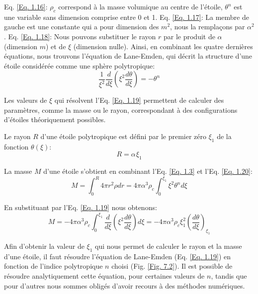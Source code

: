 Eq. \ref{Eq. 1.16}: $\rho_{c}$ correspond à la masse volumique au centre de l'étoile, $\theta^{n}$ est une variable sans dimension
comprise entre 0 et 1.\smallskip\newline
Eq. \ref{Eq. 1.17}: La membre de gauche est une constante qui a pour dimension des $m^{2}$, nous la remplaçons par $\alpha^{2}$.\smallskip\newline
Eq. \ref{Eq. 1.18}: Nous pouvons substituer le rayon $r$ par le produit de $\alpha$ (dimension $m$) et de $\xi$ (dimension nulle).\bigskip
Ainsi, en combinant les quatre dernières équations, nous trouvons l'équation de Lane-Emden\footnotemark[6], qui décrit la structure d'une étoile considérée comme une sphère polytropique:\begin{equation}\boxed{\dfrac{1}{\xi^{2}}\dfrac{d}{d\xi}\left( \xi^{2}\dfrac{d\theta}{d\xi}\right) =-\theta^{n}}\label{Eq. 1.19}\end{equation}

Les valeurs de $\xi$ qui résolvent l'Eq. \ref{Eq. 1.19} permettent de calculer des paramètres, comme la masse ou le rayon\footnotemark[7], correspondant à des configurations d'étoiles théoriquement possibles.\smallskip 

Le rayon $R$ d'une étoile polytropique est défini par le premier zéro $\xi_{1}$ de la fonction $\theta(\xi)$\footnotemark[8]:\begin{equation}R=\alpha\hspace{1pt}\xi_{1}\label{Eq. 1.20}\end{equation}

La masse $M$ d'une étoile s'obtient en combinant l'Eq. \ref{Eq. 1.3} et l'Eq. \ref{Eq. 1.20}:\begin{equation}M=\int_{0}^{R}4\pi r^{2}\rho dr=4\pi \alpha^{3} \rho_{c}\int_{0}^{\xi_{1}}\xi^{2}\theta^{n}d\xi\label{Eq. 1.21}\end{equation}

En substituant par l'Eq. \ref{Eq. 1.19} nous obtenons:\begin{equation}M=-4\pi \alpha^{3}\rho_{c}\int_{0}^{\xi_{1}}\dfrac{d}{d\xi}\left(\xi^2\dfrac{d\theta}{d\xi}\right)d\xi=-4\pi \alpha^{3}\rho_{c}\xi^{2}_{1}\left( \dfrac{d\theta}{d\xi}\right)_{\xi_{1}}\label{Eq. 1.22}\end{equation}\bigskip

Afin d'obtenir la valeur de $\xi_{1}$ qui nous permet de calculer le rayon et la masse d'une étoile, il faut résoudre l'équation de Lane-Emden (Eq. \ref{Eq. 1.19}) en fonction de l'indice polytropique $n$ choisi (Fig. \ref{Fig. 7.2}). Il est possible de résoudre analytiquement cette équation, pour certaines valeurs de $n$, tandis que pour d'autres nous sommes obligés d'avoir recours à des méthodes numériques.\smallskip 

